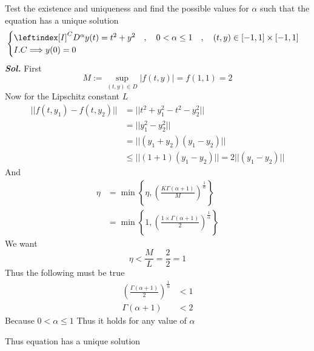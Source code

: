 \begin{example}
    Test the existence and uniqueness and find the possible values for $\alpha$ such that the equation has a unique solution
    \[
        \begin{cases}
            \leftindex[I]^C {D^{\alpha}} y(t) = t^2 + y^2 \quad,\quad 0< \alpha \leq 1 \quad,\quad (t,y) \in [-1,1]\times[-1,1]
            \\
            I.C \Longrightarrow y(0) = 0
        \end{cases}
    \]
    \textit{ \textbf{Sol.} } First
    \[
    M := \sup\limits_{(t,y)\in D} |f(t,y)| = f(1,1) = 2
    \]
    Now for the Lipschitz constant $L$
    \begin{align*}
        ||f(t,y_1)-f(t,y_2)|| &= ||t^2+y_1^2-t^2-y_2^2||
        \\
        &= ||y_1^2-y_2^2||
        \\
        &= ||(y_1+y_2)(y_1-y_2)||
        \\
        &\leq ||(1+1)(y_1-y_2)|| = 2||(y_1-y_2)||
    \end{align*}
    And 
    \begin{align*}
        \eta &= \min\left\{\eta , \left(\frac{K\Gamma(\alpha+1)}{M}\right)^{\frac{1}{\alpha}} \right\}
        \\
        &= \min\left\{1 , \left(\frac{1\times \Gamma(\alpha+1)}{2}\right)^{\frac{1}{\alpha}} \right\}
    \end{align*}
    We want 
    \[
        \eta < \frac{M}{L} = \frac{2}{2} = 1
    \]
    Thus the following must be true
    \begin{align*}
        \left(\frac{\Gamma(\alpha+1)}{2}\right)^{\frac{1}{\alpha}} &< 1
        \\
        \Gamma(\alpha+1) &< 2
    \end{align*}
    Because $0< \alpha \leq 1$ Thus it holds for any value of $\alpha$

    Thus equation has a unique solution


\end{example}
